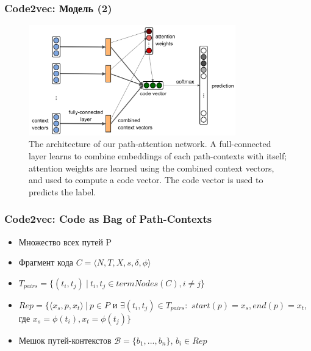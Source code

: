 \documentclass[xcolor=table,english]{beamer}
\begin{document}
\begin{frame}[fragile] \frametitle{Code2vec: Модель (2)}
    \begin{minipage}[m]{\linewidth}
        \begin{figure}
            \centering
            \includegraphics[width=0.8\textwidth]{figures/code2vec_model.png}
            \caption{The architecture of our path-attention network. A full-connected layer learns to combine embeddings of each path-contexts with itself; attention weights are learned using the combined context vectors, and used to compute a code vector. The code vector is used to predicts the label.}
        \end{figure}
    \end{minipage}\hfill
\end{frame}

\begin{frame}[fragile] \frametitle{Code2vec: Code as Bag of Path-Contexts}
    \begin{itemize}
        \item Множество всех путей P
        \item Фрагмент кода $C = \langle N, T, X, s, \delta, \phi \rangle$
        \item $T_{pairs} = \{ (t_i, t_j)~|~t_i, t_j \in termNodes(C), i \neq j\}$
        \item $Rep = \{ \langle x_s, p, x_t \rangle ~|~ p \in P$ и $\exists (t_i, t_j) \in T_{pairs}:$ $start(p) = x_s, end(p) = x_t$, где $x_s = \phi(t_i), x_t = \phi(t_j) \}$
        \item Мешок путей-контекстов $\mathcal{B} = \{ b_1, ... , b_n \}$, $b_i \in Rep$
    \end{itemize}
\end{frame}
\end{document}
